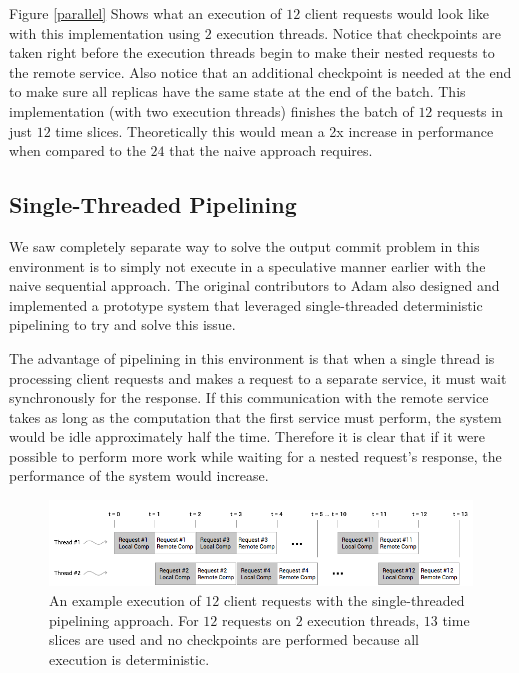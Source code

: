 \documentclass[11pt, oneside]{report}
\begin{document}
Figure \ref{parallel} Shows what an execution of $12$ client requests would look like with this implementation using $2$ execution threads. 
Notice that checkpoints are taken right before the execution threads begin to make their nested requests to the remote service. 
Also notice that an additional checkpoint is needed at the end to make sure all replicas have the same state at the end of the batch.
This implementation (with two execution threads) finishes the batch of $12$ requests in just $12$ time slices.
Theoretically this would mean a 2x increase in performance when compared to the $24$ that the naive approach requires.

\subsection{Single-Threaded Pipelining}\label{STP}

We saw completely separate way to solve the output commit problem in this environment is to simply not execute in a speculative manner earlier with the naive sequential approach. 
The original contributors to Adam also designed and implemented a prototype system that leveraged single-threaded deterministic pipelining to try and solve this issue.

The advantage of pipelining in this environment is that when a single thread is processing client requests and makes a request to a separate service, it must wait synchronously for the response. 
If this communication with the remote service takes as long as the computation that the first service must perform, the system would be idle approximately half the time.
Therefore it is clear that if it were possible to perform more work while waiting for a nested request's response, the performance of the system would increase.

\begin{figure}[h]
\centering
\includegraphics[width=1.0\textwidth]{SequentialPipelined.png}
\caption{\label{seqpipe}An example execution of $12$ client requests with the single-threaded pipelining approach. For $12$ requests on $2$ execution threads, $13$ time slices are used and no checkpoints are performed because all execution is deterministic.}
\end{figure}
\end{document}
